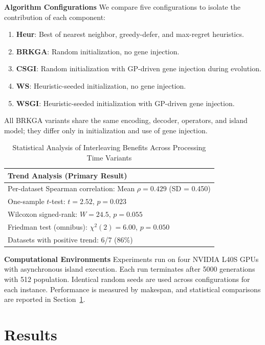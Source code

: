 \documentclass[sigconf]{acmart}
\begin{document}
\textbf{Algorithm Configurations} We compare five configurations to isolate the contribution of each component:
\begin{enumerate}
    \item \textbf{Heur}: Best of nearest neighbor, greedy-defer, and max-regret heuristics.
    \item \textbf{BRKGA}: Random initialization, no gene injection.
    \item \textbf{CSGI}: Random initialization with GP-driven gene injection during evolution.
    \item \textbf{WS}: Heuristic-seeded initialization, no gene injection.
    \item \textbf{WSGI}: Heuristic-seeded initialization with GP-driven gene injection.
\end{enumerate}
All BRKGA variants share the same encoding, decoder, operators, and island model; they differ only in initialization and use of gene injection.


\begin{table}[htbp]
\centering
\caption{Statistical Analysis of Interleaving Benefits Across Processing Time Variants}
\label{tab:trend_analysis}
\begin{tabular}{lcccc}
\multicolumn{5}{l}{\textbf{Trend Analysis (Primary Result)}} \\
\hline
\multicolumn{5}{l}{Per-dataset Spearman correlation: Mean $\rho = 0.429$ (SD = 0.450)} \\
\multicolumn{5}{l}{One-sample $t$-test: $t = 2.52$, $p = 0.023$} \\
\multicolumn{5}{l}{Wilcoxon signed-rank: $W = 24.5$, $p = 0.055$} \\
\multicolumn{5}{l}{Friedman test (omnibus): $\chi^2(2) = 6.00$, $p = 0.050$} \\
\multicolumn{5}{l}{Datasets with positive trend: 6/7 (86\%)} \\
\hline
\end{tabular}
\end{table}


\textbf{Computational Environments} Experiments run on four NVIDIA L40S GPUs with asynchronous island execution. Each run terminates after 5000 generations with 512 population. Identical random seeds are used across configurations for each instance. Performance is measured by makespan, and statistical comparisons are reported in Section~\ref{sec:results}.

\section{Results}
\label{sec:results}
\end{document}
